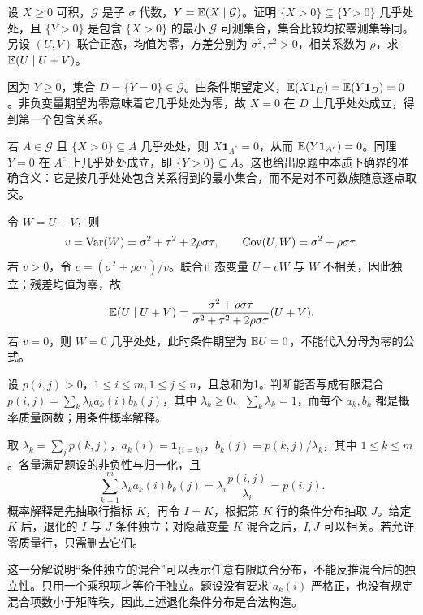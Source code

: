 \begin{example}[原题2：条件期望的正值集合与正态投影]\label{yau:2012-2}
设 $X\ge0$ 可积，$\mathcal G$ 是子 $\sigma$ 代数，$Y=\mathbb E(X\mid\mathcal G)$。证明 $\{X>0\}\subseteq\{Y>0\}$ 几乎处处，且 $\{Y>0\}$ 是包含 $\{X>0\}$ 的最小 $\mathcal G$ 可测集合，集合比较均按零测集等同。另设 $(U,V)$ 联合正态，均值为零，方差分别为 $\sigma^2,\tau^2>0$，相关系数为 $\rho$，求 $\mathbb E(U\mid U+V)$。
\end{example}
\begin{solve}
因为 $Y\ge0$，集合 $D=\{Y=0\}\in\mathcal G$。由条件期望定义，$\mathbb E(X\mathbf1_D)=\mathbb E(Y\mathbf1_D)=0$。非负变量期望为零意味着它几乎处处为零，故 $X=0$ 在 $D$ 上几乎处处成立，得到第一个包含关系。

若 $A\in\mathcal G$ 且 $\{X>0\}\subseteq A$ 几乎处处，则 $X\mathbf1_{A^c}=0$，从而 $\mathbb E(Y\mathbf1_{A^c})=0$。同理 $Y=0$ 在 $A^c$ 上几乎处处成立，即 $\{Y>0\}\subseteq A$。这也给出原题中本质下确界的准确含义：它是按几乎处处包含关系得到的最小集合，而不是对不可数族随意逐点取交。

令 $W=U+V$，则
\[
v=\operatorname{Var}(W)=\sigma^2+\tau^2+2\rho\sigma\tau,\qquad \operatorname{Cov}(U,W)=\sigma^2+\rho\sigma\tau.
\]
若 $v>0$，令 $c=(\sigma^2+\rho\sigma\tau)/v$。联合正态变量 $U-cW$ 与 $W$ 不相关，因此独立；残差均值为零，故
\[
\mathbb E(U\mid U+V)=\frac{\sigma^2+\rho\sigma\tau}{\sigma^2+\tau^2+2\rho\sigma\tau}(U+V).
\]
若 $v=0$，则 $W=0$ 几乎处处，此时条件期望为 $\mathbb E U=0$，不能代入分母为零的公式。
\end{solve}

\begin{example}[原题3：联合分布的乘积分布混合]\label{yau:2012-3}
设 $p(i,j)>0$，$1\le i\le m,1\le j\le n$，且总和为1。判断能否写成有限混合 $p(i,j)=\sum_k\lambda_k a_k(i)b_k(j)$，其中 $\lambda_k\ge0$、$\sum_k\lambda_k=1$，而每个 $a_k,b_k$ 都是概率质量函数；用条件概率解释。
\end{example}
\begin{solve}
取 $\lambda_k=\sum_jp(k,j)$，$a_k(i)=\mathbf1_{\{i=k\}}$，$b_k(j)=p(k,j)/\lambda_k$，其中 $1\le k\le m$。各量满足题设的非负性与归一化，且
\[
\sum_{k=1}^m\lambda_k a_k(i)b_k(j)=\lambda_i\frac{p(i,j)}{\lambda_i}=p(i,j).
\]
概率解释是先抽取行指标 $K$，再令 $I=K$，根据第 $K$ 行的条件分布抽取 $J$。给定 $K$ 后，退化的 $I$ 与 $J$ 条件独立；对隐藏变量 $K$ 混合之后，$I,J$ 可以相关。若允许零质量行，只需删去它们。

这一分解说明“条件独立的混合”可以表示任意有限联合分布，不能反推混合后的独立性。只用一个乘积项才等价于独立。题设没有要求 $a_k(i)$ 严格正，也没有规定混合项数小于矩阵秩，因此上述退化条件分布是合法构造。
\end{solve}

